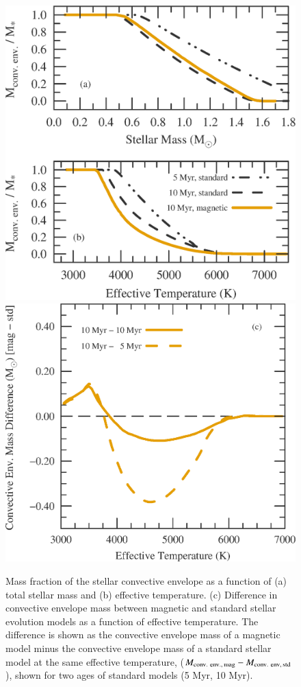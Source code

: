\documentclass{aa}
\begin{document}
\begin{figure}[!ht]
    \centering
    \includegraphics[width=0.42\linewidth]{convective_env_masses.eps} \qquad
    \includegraphics[width=0.48\linewidth]{convective_env_mass_difference.eps}
    \caption{Mass fraction of the stellar convective envelope as a function of (a) total stellar mass and (b) effective temperature. (c) Difference in convective envelope mass between magnetic and standard stellar evolution models as a function of effective temperature. The difference is shown as the convective envelope mass of a magnetic model minus the convective envelope mass of a standard stellar model at the same effective temperature, ($M_{\rm conv.\ env.,\, mag} - M_{\rm conv.\ env,\, std}$), shown for two ages of standard models (5 Myr, 10 Myr).}
    \label{fig:rad_core}
\end{figure}
\end{document}
